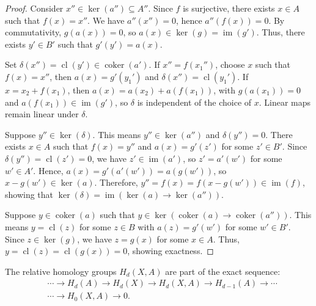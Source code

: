 \begin{proof}
	Consider \( x'' \in \ker(a'') \subseteq A'' \). Since \( f \) is surjective, there exists \( x \in A \) such that \( f(x) = x'' \). We have \( a''(x'') = 0 \), hence \( a''(f(x)) = 0 \). By commutativity, \( g(a(x)) = 0 \), so \( a(x) \in \ker(g) = \operatorname{im}(g') \). Thus, there exists \( y' \in B' \) such that \( g'(y') = a(x) \).
			
	Set \( \delta(x'') = \operatorname{cl}(y') \in \operatorname{coker}(a') \). If \( x'' = f(x_1'') \), choose \( x \) such that \( f(x) = x'' \), then \( a(x) = g'(y_1') \) and \( \delta(x'') = \operatorname{cl}(y_1') \). If \( x = x_2 + f(x_1) \), then \( a(x) = a(x_2) + a(f(x_1)) \), with \( g(a(x_1)) = 0 \) and \( a(f(x_1)) \in \operatorname{im}(g') \), so \( \delta \) is independent of the choice of \( x \). Linear maps remain linear under \( \delta \).
			
	Suppose \( y'' \in \ker(\delta) \). This means \( y'' \in \ker(a'') \) and \( \delta(y'') = 0 \). There exists \( x \in A \) such that \( f(x) = y'' \) and \( a(x) = g'(z') \) for some \( z' \in B' \). Since \( \delta(y'') = \operatorname{cl}(z') = 0 \), we have \( z' \in \operatorname{im}(a') \), so \( z' = a'(w') \) for some \( w' \in A' \). Hence, \( a(x) = g'(a'(w')) = a(g(w')) \), so \( x - g(w') \in \ker(a) \). Therefore, \( y'' = f(x) = f(x - g(w')) \in \operatorname{im}(f) \), showing that \( \ker(\delta) = \operatorname{im}(\ker(a) \rightarrow \ker(a'')) \).
			
	Suppose \( y \in \operatorname{coker}(a) \) such that \( y \in \ker(\operatorname{coker}(a) \rightarrow \operatorname{coker}(a'')) \). This means \( y = \operatorname{cl}(z) \) for some \( z \in B \) with \( a(z) = g'(w') \) for some \( w' \in B' \). Since \( z \in \ker(g) \), we have \( z = g(x) \) for some \( x \in A \). Thus, \( y = \operatorname{cl}(z) = \operatorname{cl}(g(x)) = 0 \), showing exactness.
\end{proof}

\begin{theorem}{\cite[p.115ff]{hatcher2005algebraic}}
	The relative homology groups \( H_{d}(X, A) \) are part of the exact sequence:
	\begin{align}
		  & \cdots \rightarrow H_{d}(A) \rightarrow H_{d}(X) \rightarrow H_{d}(X, A) \rightarrow H_{d-1}(A) \rightarrow \cdots \\
		  & \cdots \rightarrow H_{0}(X, A) \rightarrow 0.                                                                      
	\end{align}
\end{theorem}

